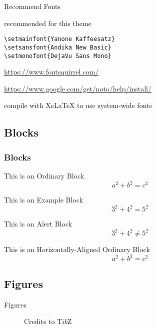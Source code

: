 \documentclass[compress]{beamer}
\begin{document}
\begin{frame}[fragile]{Recommend Fonts}
  \begin{description}
  \item[Selected Fonts] recommended for this theme\\
    \begin{lstlisting}[basicstyle = \ttfamily\small]
\setmainfont{Yanone Kaffeesatz}
\setsansfont{Andika New Basic}
\setmonofont{DejaVu Sans Mono}
    \end{lstlisting}
  \item[Download] {\small \url{https://www.fontsquirrel.com/}}
  \item[Install Fonts] {\small \url{https://www.google.com/get/noto/help/install/}}
  \item[Compilation] compile with XeLaTeX to use system-wide fonts
  \end{description}

\end{frame}


\subsection{Blocks}

\begin{frame}
  \frametitle{Blocks}
  \begin{block}{This is an Ordinary Block}
    \[
      a^2 + b^2 = c^2
    \]
  \end{block}
  \begin{exampleblock}{This is an Example Block}
    \[
      3^2+4^2 = 5^2
    \]
  \end{exampleblock}
  \begin{alertblock}{This is an Alert Block}
    \[
      3^2+4^2 \neq 5^2
    \]
  \end{alertblock}

  \centering
  \begin{minipage}{1.0\linewidth}
    \begin{block}{This is an Horizontally-Aligned Ordinary Block}
      \[
        a^2 + b^2 = c^2
      \]
    \end{block}
  \end{minipage}
\end{frame}

\subsection{Figures}

\begin{frame}{Figures}
  \begin{figure}
    \centering
    \caption{Credits to Ti\textit{k}Z}
  \end{figure}
\end{frame}
\end{document}
